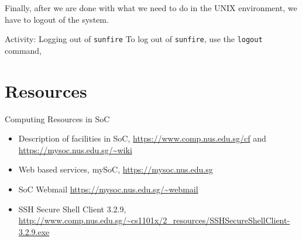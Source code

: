Finally, after we are done with what we need to do in the UNIX environment, we
have to logout of the system.  

\begin{frame}{Activity: Logging out of \texttt{sunfire}}
To log out of \texttt{sunfire}, use the \texttt{logout} command, 
\end{frame}

\section{Resources}

\begin{frame}{Computing Resources in SoC}
\begin{itemize}
\item Description of facilities in SoC, \url{https://www.comp.nus.edu.sg/cf} and \url{https://mysoc.nus.edu.sg/~wiki}
\item Web based services, mySoC, \url{https://mysoc.nus.edu.sg}
\item SoC Webmail \url{https://mysoc.nus.edu.sg/~webmail}
\item SSH Secure Shell Client 3.2.9, \url{http://www.comp.nus.edu.sg/~cs1101x/2_resources/SSHSecureShellClient-3.2.9.exe}
\end{itemize}
\end{frame}


